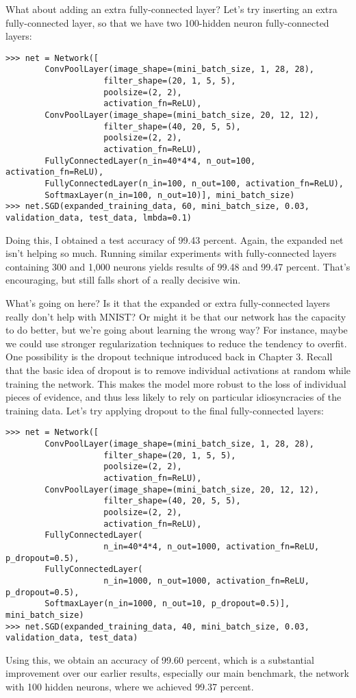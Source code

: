 \documentclass[a4paper,twoside,10pt]{book}
\begin{document}
What about adding an extra fully-connected layer? Let's try inserting an extra fully-connected layer, so that we have two 100-hidden neuron fully-connected layers:

\begin{lstlisting}
>>> net = Network([
		ConvPoolLayer(image_shape=(mini_batch_size, 1, 28, 28), 
					filter_shape=(20, 1, 5, 5), 
					poolsize=(2, 2), 
					activation_fn=ReLU),
		ConvPoolLayer(image_shape=(mini_batch_size, 20, 12, 12), 
					filter_shape=(40, 20, 5, 5), 
					poolsize=(2, 2), 
					activation_fn=ReLU),
		FullyConnectedLayer(n_in=40*4*4, n_out=100, activation_fn=ReLU),
		FullyConnectedLayer(n_in=100, n_out=100, activation_fn=ReLU),
		SoftmaxLayer(n_in=100, n_out=10)], mini_batch_size)
>>> net.SGD(expanded_training_data, 60, mini_batch_size, 0.03, validation_data, test_data, lmbda=0.1)

\end{lstlisting}
Doing this, I obtained a test accuracy of 99.43 percent. Again, the expanded net isn't helping so much. Running similar experiments with fully-connected layers containing 300 and 1,000 neurons yields results of 99.48 and 99.47 percent. That's encouraging, but still falls short of a really decisive win.


What's going on here? Is it that the expanded or extra fully-connected layers really don't help with MNIST? Or might it be that our network has the capacity to do better, but we're going about learning the wrong way? For instance, maybe we could use stronger regularization techniques to reduce the tendency to overfit. One possibility is the dropout technique introduced back in Chapter 3. Recall that the basic idea of dropout is to remove individual activations at random while training the network. This makes the model more robust to the loss of individual pieces of evidence, and thus less likely to rely on particular idiosyncracies of the training data. Let's try applying dropout to the final fully-connected layers:

\begin{lstlisting}
>>> net = Network([
		ConvPoolLayer(image_shape=(mini_batch_size, 1, 28, 28), 
					filter_shape=(20, 1, 5, 5), 
					poolsize=(2, 2), 
					activation_fn=ReLU),
		ConvPoolLayer(image_shape=(mini_batch_size, 20, 12, 12), 
					filter_shape=(40, 20, 5, 5), 
					poolsize=(2, 2), 
					activation_fn=ReLU),
		FullyConnectedLayer(
					n_in=40*4*4, n_out=1000, activation_fn=ReLU, p_dropout=0.5),
		FullyConnectedLayer(
					n_in=1000, n_out=1000, activation_fn=ReLU, p_dropout=0.5),
		SoftmaxLayer(n_in=1000, n_out=10, p_dropout=0.5)], 
mini_batch_size)
>>> net.SGD(expanded_training_data, 40, mini_batch_size, 0.03, 
validation_data, test_data)

\end{lstlisting}
Using this, we obtain an accuracy of 99.60 percent, which is a substantial improvement over our earlier results, especially our main benchmark, the network with 100 hidden neurons, where we achieved 99.37 percent.
\end{document}
